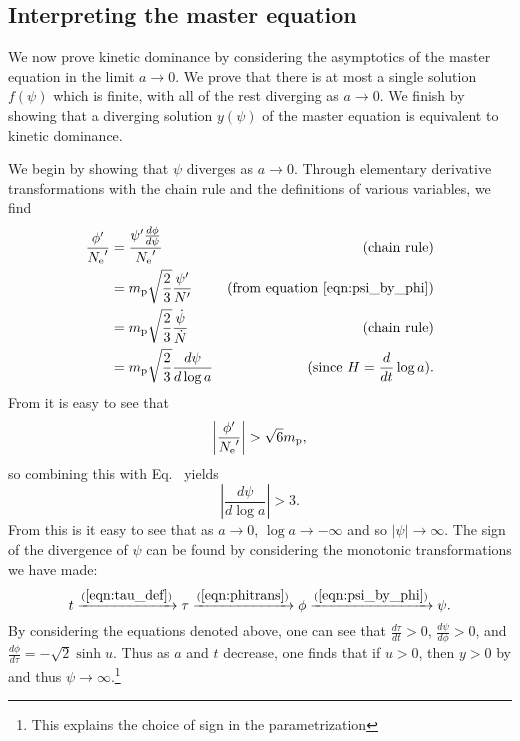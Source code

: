 \subsection{Interpreting the master equation}
\label{sec:interpreting_the_master_equation}

We now prove kinetic dominance by considering the asymptotics of the
master equation  in the limit $a\rightarrow0$. We
prove that there is at most a single solution $f(\psi)$ which is
finite, with all of the rest diverging as $a\rightarrow0$. We finish
by showing that a diverging solution $y(\psi)$ of the master equation
is equivalent to kinetic dominance.

We begin by showing that $\psi$ diverges as $a\rightarrow0$. Through
elementary derivative transformations with the chain rule and the
definitions of various variables, we find
%
\begin{align}
  \frac{{{\phi}^\prime}}{{{N_\mathrm{e}}^\prime}} 
  &=
  \frac{{{\psi}^\prime}\frac{d\phi}{d\psi}}{{{N_\mathrm{e}}^\prime}}
  &\text{(chain rule)} 
  \nonumber
  \\
  &=
  m_{\mathrm{p}}\sqrt{\frac{2}{3}}\frac{{{\psi}^\prime}}{{{N}^\prime}}  
  &\text{(from equation \protect\ref{eqn:psi_by_phi})} 
  \nonumber
  \\
  &=
  m_{\mathrm{p}}\sqrt{\frac{2}{3}}\frac{\dot\psi}{\dot{N}}  
  &\text{(chain rule)} 
  \nonumber
  \\
  &=
  m_{\mathrm{p}}\sqrt{\frac{2}{3}}\frac{d\psi}{d\log a}
  &\text{(since $H=\frac{d}{dt}\log a$)}.
  \label{eqn:div_psi}
\end{align}
%
From  it is easy to see that
%
\begin{equation}
  \left|\frac{{{\phi}^\prime}}{{{N_\mathrm{e}}^\prime}}\right| > \sqrt{6}m_{\mathrm{p}}, 
\end{equation}
%
so combining this with Eq.\  yields
%
\begin{equation}
  \left|\frac{d\psi}{d\log a}\right| > 3. 
\end{equation}
%
From this is it easy to see that as $a\to0$, $\log a\to-\infty$ and so $|\psi|\to\infty$. The sign of the divergence of $\psi$ can be found by considering the monotonic transformations we have made:
%
\begin{equation}
  t
  \xrightarrow{\protect\eref{eqn:tau_def}}
  \tau
  \xrightarrow{\protect\eref{eqn:phitrans}}
  \phi
  \xrightarrow{\protect\eref{eqn:psi_by_phi}}
  \psi.
\end{equation}
%
By considering the equations denoted above, one can see that
$\frac{d\tau}{dt}>0$, $\frac{d\psi}{d\phi}>0$, and
$\frac{d\phi}{d\tau} = -\sqrt{2}\sinh u$. Thus as $a$ and $t$
decrease, one finds that if $u>0$, then $y>0$ by  and
thus $\psi\to\infty$.\footnote{This explains the choice of sign in
  the parametrization \protect{}}



